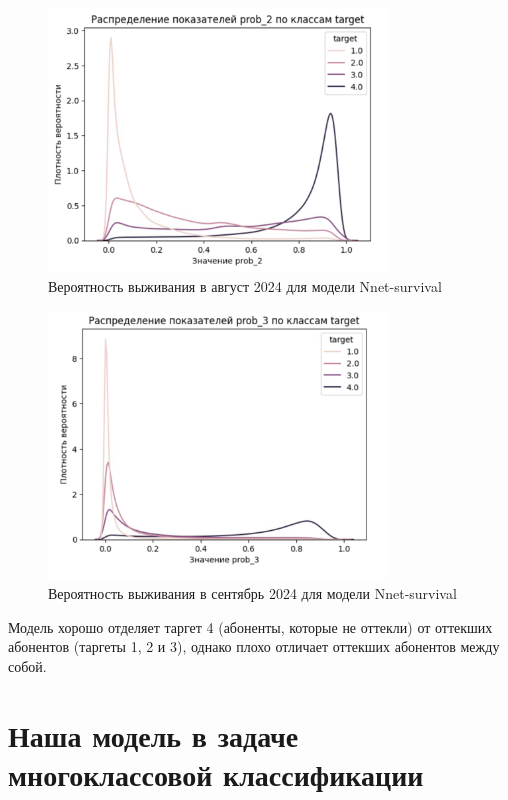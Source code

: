 \documentclass[a4paper,14pt,oneside,openany]{memoir}
\begin{document}
\begin{figure}[H]
	\includegraphics[width=0.8\textwidth]{../figures/prob_2_nnet.png}
	\caption{Вероятность выживания в август 2024 для модели Nnet-survival}
\end{figure}

\begin{figure}[H]
	\includegraphics[width=0.8\textwidth]{../figures/prob_3_nnet.png}
	\caption{Вероятность выживания в сентябрь 2024 для модели Nnet-survival}
\end{figure}

Модель хорошо отделяет таргет 4 (абоненты, которые не оттекли) от оттекших абонентов (таргеты 1, 2 и 3), однако плохо отличает оттекших абонентов между собой. 

\section{Наша модель в задаче многоклассовой классификации}
\end{document}
